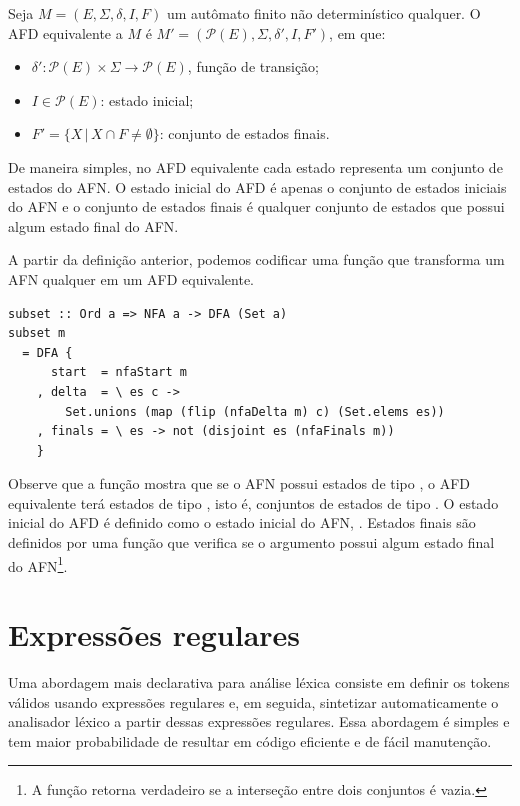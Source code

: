 \begin{Definition}
  Seja $M = (E,\Sigma, \delta, I, F)$ um autômato
  finito não determinístico qualquer. O AFD equivalente a $M$ é
  $M' = (\mathcal{P}(E),\Sigma,\delta',I,F')$, em que:

  \begin{itemize}
    \item
      \(\delta' : \mathcal{P}(E) \times \Sigma \to \mathcal{P}(E)\),
      função de transição;
    \item
      \(I \in \mathcal{P}(E)\): estado inicial;
    \item
      \(F' =\{X \,|\, X \cap F \neq \emptyset\}\): conjunto de estados finais.
  \end{itemize}

  De maneira simples, no AFD equivalente cada estado representa um
  conjunto de estados do AFN. O estado inicial do AFD é apenas o
  conjunto de estados iniciais do AFN e o conjunto de estados finais
  é qualquer conjunto de estados que possui algum estado final do AFN.
\end{Definition}

A partir da definição anterior, podemos codificar uma função que
transforma um AFN qualquer em um AFD equivalente.

\begin{verbatim}
subset :: Ord a => NFA a -> DFA (Set a)
subset m
  = DFA {
      start  = nfaStart m
    , delta  = \ es c ->
        Set.unions (map (flip (nfaDelta m) c) (Set.elems es))
    , finals = \ es -> not (disjoint es (nfaFinals m))
    }
\end{verbatim}

Observe que a função mostra que se o AFN possui estados de tipo
, o AFD equivalente terá estados de tipo
, isto é, conjuntos de estados de tipo
. O estado inicial do AFD é definido como
o estado inicial do AFN, .
Estados finais são definidos por uma função que verifica se o
argumento possui algum estado final do AFN\footnote{A função
   retorna verdadeiro se a interseção
entre dois conjuntos é vazia.}.

\section{Expressões regulares}

Uma abordagem mais declarativa para análise léxica consiste em
definir os tokens válidos usando expressões regulares e, em seguida,
sintetizar automaticamente o analisador léxico a partir dessas
expressões regulares. Essa abordagem é simples e tem maior
probabilidade de resultar em código eficiente e de fácil manutenção.

